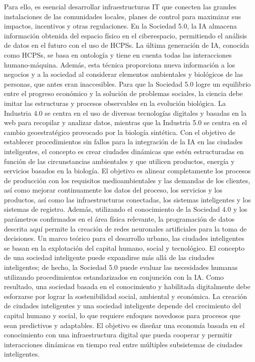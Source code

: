 \documentclass[crop=false]{standalone}
\begin{document}
Para ello, es esencial desarrollar infraestructuras IT que conecten las grandes instalaciones de las comunidades locales, planes de control para maximizar sus impactos, incentivos y otras regulaciones.
En la Sociedad 5.0, la IA almacena información obtenida del espacio físico en el ciberespacio, permitiendo el análisis de datos en el futuro con el uso de HCPSs. La última generación de IA, conocida como HCPSs, se basa en ontología y tiene en cuenta todas las interacciones humano-máquina. Además, esta técnica proporciona nueva información a los negocios y a la sociedad al considerar elementos ambientales y biológicos de las personas, que antes eran inaccesibles. Para que la Sociedad 5.0 logre un equilibrio entre el progreso económico y la solución de problemas sociales, la ciencia debe imitar las estructuras y procesos observables en la evolución biológica.
La Industria 4.0 se centra en el uso de diversas tecnologías digitales y basadas en la web para recopilar y analizar datos, mientras que la Industria 5.0 se centra en el cambio geoestratégico provocado por la biología sintética.
Con el objetivo de establecer procedimientos sin fallos para la integración de la IA en las ciudades inteligentes, el concepto es crear ciudades dinámicas que estén estructuradas en función de las circunstancias ambientales y que utilicen productos, energía y servicios basados en la biología. El objetivo es alinear completamente los procesos de producción con los requisitos medioambientales y las demandas de los clientes, así como mejorar continuamente los datos del proceso, los servicios y los productos, así como las infraestructuras conectadas, los sistemas inteligentes y los sistemas de registro. Además, utilizando el conocimiento de la Sociedad 4.0 y los parámetros confirmados en el área física relevante, la programación de datos descrita aquí permite la creación de redes neuronales artificiales para la toma de decisiones.
Un marco teórico para el desarrollo urbano, las ciudades inteligentes se basan en la explotación del capital humano, social y tecnológico. El concepto de una sociedad inteligente puede expandirse más allá de las ciudades inteligentes; de hecho, la Sociedad 5.0 puede evaluar las necesidades humanas utilizando procedimientos estandarizados en conjunción con la IA. Como resultado, una sociedad basada en el conocimiento y habilitada digitalmente debe esforzarse por lograr la sostenibilidad social, ambiental y económica.
La creación de ciudades inteligentes y una sociedad inteligente depende del crecimiento del capital humano y social, lo que requiere enfoques novedosos para procesos que sean predictivos y adaptables. El objetivo es diseñar una economía basada en el conocimiento con una infraestructura digital que pueda cooperar y permitir interacciones dinámicas en tiempo real entre múltiples subsistemas de ciudades inteligentes.
\end{document}
